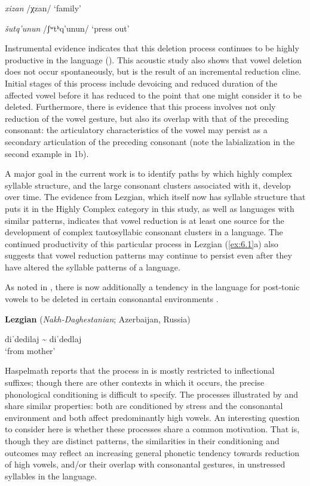 \textit{xizan}      /χzan/      ‘family’

\textit{šutq’unun}    /ʃʷtʰq’unun/    ‘press out’
\citep[36-8]{Haspelmath1993}
\z
\z

  Instrumental evidence indicates that this deletion process continues to be highly productive in the language (\citealt{ChitoranBabaliyeva2007}). This acoustic study also shows that vowel deletion does not occur spontaneously, but is the result of an incremental reduction cline. Initial stages of this process include devoicing and reduced duration of the affected vowel before it has reduced to the point that one might consider it to be deleted. Furthermore, there is evidence that this process involves not only reduction of the vowel gesture, but also its overlap with that of the preceding consonant: the articulatory characteristics of the vowel may persist as a secondary articulation of the preceding consonant (note the labialization in the second example in 1b).

  A major goal in the current work is to identify paths by which highly complex syllable structure, and the large consonant clusters associated with it, develop over time. The evidence from Lezgian, which itself now has syllable structure that puts it in the Highly Complex category in this study, as well as languages with similar patterns, indicates that vowel reduction is at least one source for the development of complex tautosyllabic consonant clusters in a language. The continued productivity of this particular process in Lezgian (\ref{ex:6.1}a) also suggests that vowel reduction patterns may continue to persist even after they have altered the syllable patterns of a language. 

  As noted in , there is now additionally a tendency in the language for post-tonic vowels to be deleted in certain consonantal environments .

\ea\label{ex:6.2}
  \textbf{Lezgian} (\textit{Nakh-Daghestanian}; Azerbaijan, Russia)

diˈdedilaj {\textasciitilde} diˈdedlaj\\
\glt ‘from mother’
\citep[40]{Haspelmath1993}
\z

Haspelmath reports that the process in  is mostly restricted to inflectional suffixes; though there are other contexts in which it occurs, the precise phonological conditioning is difficult to specify. The processes illustrated by  and  share similar properties: both are conditioned by stress and the consonantal environment and both affect predominantly high vowels. An interesting question to consider here is whether these processes share a common motivation. That is, though they are distinct patterns, the similarities in their conditioning and outcomes may reflect an increasing general phonetic tendency towards reduction of high vowels, and/or their overlap with consonantal gestures, in unstressed syllables in the language.

